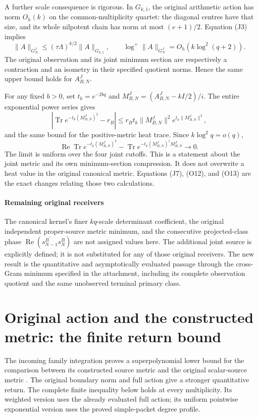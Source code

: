 \documentclass[11pt]{article}
\begin{document}
A further scale consequence is rigorous. In \(G_{k,1}\), the original arithmetic action has norm \(O_h(k)\) on the common-multiplicity quartet: the diagonal centres have that size, and its whole nilpotent chain has norm at most \((e+1)/2\). Equation (J3) implies \[
 \|A\|_{G_N^J}
 \le(\tau\Lambda)^{k/2}\|A\|_{G_{k,1}},
 \qquad
 \log^+\|A\|_{G_N^J}=O_h(k\log^2(q+2)).
 \tag{O14}
\] The original observation and its joint minimum section are respectively a contraction and an isometry in their specified quotient norms. Hence the same upper bound holds for \(A_{B,N}^J\).

For any fixed \(b>0\), set \(t_k=e^{-2bq}\) and \(M_{B,N}^J=(A_{B,N}^J-kI/2)/i\). The entire exponential power series gives \[
 |\operatorname{Tr}e^{-t_k(M_{B,N}^J)^2}-r_B|
 \le r_B t_k\|M_{B,N}^J\|^2
       e^{t_k\|M_{B,N}^J\|^2},
\] and the same bound for the positive-metric heat trace. Since \(k\log^2q=o(q)\), \[
 \operatorname{Re}\operatorname{Tr}e^{-t_k(M_{B,N}^J)^2}
 -\operatorname{Tr}e^{-t_k(M_{B,N}^J)^\dagger M_{B,N}^J}
 \longrightarrow0. \tag{O15}
\] The limit is uniform over the four joint cutoffs. This is a statement about the joint metric and its own minimum-section compression. It does not overwrite a heat value in the original canonical metric. Equations (J7), (O12), and (O13) are the exact changes relating those two calculations.

\subsection{Remaining original receivers}\label{remaining-original-receivers}

The canonical kernel's finer \(kq\)-scale determinant coefficient, the original independent proper-source metric minimum, and the consecutive projected-class phase \(\operatorname{Re}(\overline{s_{N-1}^B}s_N^B)\) are not assigned values here. The additional joint source is explicitly defined; it is not substituted for any of those original receivers. The new result is the quantitative and asymptotically evaluated passage through the cross-Gram minimum specified in the attachment, including its complete observation quotient and the same unobserved terminal primary class.

\clearpage
\part*{Original action and the constructed metric: the finite return bound}

The incoming family integration proves a superpolynomial lower bound
for the comparison between its constructed source metric and the
original scalar-source metric \cite{CRIncoming}. The original boundary
norm and full action give a stronger quantitative return. The complete
finite inequality below holds at every multiplicity. Its weighted
version uses the already evaluated full action; its uniform pointwise
exponential version uses the proved simple-packet degree profile.
\end{document}

